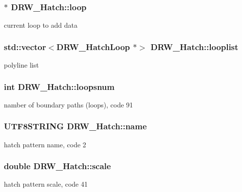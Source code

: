 \subsubsection[{loop}]{$\ast$ D\+R\+W\+\_\+\+Hatch\+::loop\hspace{0.3cm}{\ttfamily [private]}}\label{class_d_r_w___hatch_a2da61f1c2549cf8dacd0a0bb13366d56}
current loop to add data \hypertarget{class_d_r_w___hatch_a258a13a2da31ae31fd22e2da3757da5c}{}
\subsubsection[{looplist}]{\setlength{\rightskip}{0pt plus 5cm}std\+::vector$<${\bf D\+R\+W\+\_\+\+Hatch\+Loop} $\ast$$>$ D\+R\+W\+\_\+\+Hatch\+::looplist}\label{class_d_r_w___hatch_a258a13a2da31ae31fd22e2da3757da5c}
polyline list \hypertarget{class_d_r_w___hatch_a52ba4f38bba83fe735cb14447e256260}{}
\subsubsection[{loopsnum}]{\setlength{\rightskip}{0pt plus 5cm}int D\+R\+W\+\_\+\+Hatch\+::loopsnum}\label{class_d_r_w___hatch_a52ba4f38bba83fe735cb14447e256260}
namber of boundary paths (loops), code 91 \hypertarget{class_d_r_w___hatch_a3e864b79a0757b7ab2a8c32a21165150}{}
\subsubsection[{name}]{\setlength{\rightskip}{0pt plus 5cm}U\+T\+F8\+S\+T\+R\+I\+N\+G D\+R\+W\+\_\+\+Hatch\+::name}\label{class_d_r_w___hatch_a3e864b79a0757b7ab2a8c32a21165150}
hatch pattern name, code 2 \hypertarget{class_d_r_w___hatch_a0ee3311f6d41385488af2cafd55cd7ef}{}
\subsubsection[{scale}]{\setlength{\rightskip}{0pt plus 5cm}double D\+R\+W\+\_\+\+Hatch\+::scale}\label{class_d_r_w___hatch_a0ee3311f6d41385488af2cafd55cd7ef}
hatch pattern scale, code 41 \hypertarget{class_d_r_w___hatch_a4eec0fc3cd839a3892e875bcc9789d48}{}
